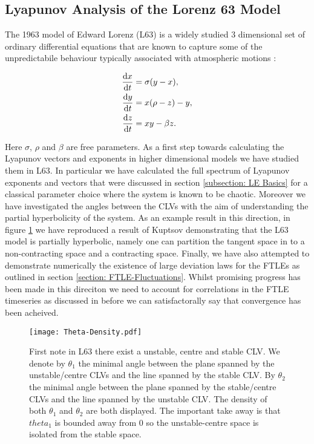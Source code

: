 \subsection{Lyapunov Analysis of the Lorenz 63 Model} \label{subsection: L63 Results}

The 1963 model of Edward Lorenz (L63) is a widely studied $3$ dimensional set of ordinary differential equations that are known to capture some of the unpredictabile behaviour typically associated with atmospheric motions  \cite{Lorenz1963} \cite{Sparrow1982}:


\begin{align}
    \dv{x}{t} &= \sigma (y - x), \\
    \dv{y}{t} &= x(\rho - z) - y,\\
    \dv{z}{t} &= xy - \beta z.
\end{align}

Here $\sigma$, $\rho$ and $\beta$ are free parameters. As a first step towards calculating the Lyapunov vectors and exponents in higher dimensional models we have studied them in L63. In particular we have calculated the full spectrum of Lyapunov exponents and vectors that were discussed in section \ref{subsection: LE Basics} for a classical parameter choice where the system is known to be chaotic. Moreover we have investigated the angles between the CLVs with the aim of understanding the partial hyperbolicity of the system. As an example result in this direction, in figure \ref{fig:L63-Angles} we have reproduced a result of Kuptsov \cite{Kuptsov2018} demonstrating that the L63 model is partially hyperbolic, namely one can partition the tangent space in to a non-contracting space and a contracting space. Finally, we have also attempted to demonstrate numerically the existence of large deviation laws for the FTLEs as outlined in section \ref{section: FTLE-Fluctuations}. Whilst promising progress has been made in this direciton we need to account for correlations in the FTLE timeseries as discussed in \cite{Galfi2019} before we can satisfactorally say that convergence has been acheived.

\begin{figure}
\centering
\texttt{[image: Theta-Density.pdf]}
\caption{First note in L63 there exist a unstable, centre and stable CLV. We denote by $\theta _1$ the minimal angle between the plane spanned by the unstable/centre CLVs and the line spanned by the stable CLV. By $\theta _2$ the minimal angle between the plane spanned by the stable/centre CLVs and the line spanned by the unstable CLV. The density of both $\theta _1$  and $\theta _2$ are both displayed. The important take away is that $theta_1$ is bounded away from $0$ so the unstable-centre space is isolated from the stable space.}
\label{fig:L63-Angles}
\end{figure}
